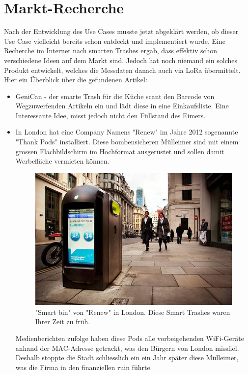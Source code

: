 \section{Markt-Recherche}
Nach der Entwicklung des Use Cases musste jetzt abgeklärt werden, ob dieser Use Case vielleicht bereits schon entdeckt und implementiert wurde. Eine Recherche im Internet nach smarten Trashes ergab, dass effektiv schon verschiedene Ideen auf dem Markt sind. Jedoch hat noch niemand ein solches Produkt entwickelt, welches die Messdaten danach auch via LoRa übermittelt. Hier ein Überblick über die gefundenen Artikel:
\begin{itemize}  
  \item GeniCan\autocite{market:genican} - der smarte Trash für die Küche scant den Barcode von Wegzuwerfenden Artikeln ein und lädt diese in eine Einkaufsliste. Eine Interessante Idee, misst jedoch nicht den Füllstand des Eimers.
  \item In London hat eine Company Namens "Renew" im Jahre 2012 sogenannte "Thank Pods"\autocite{market:LondonBins} installiert. Diese bombensicheren Mülleimer sind mit einem grossen Flachbildschirm im Hochformat ausgerüstet und sollen damit Werbefläche vermieten können. 
   \begin{figure}[H]
     \centering
        \includegraphics[scale=0.5]{pictures/London_Thank_Pod_Renew.jpg}
    \caption{"Smart bin" von "Renew" in London. Diese Smart Trashes waren Ihrer Zeit zu früh.}
    \label{fig:LondonSmartBin}
\end{figure} 
Medienberichten zufolge haben diese Pods alle vorbeigehenden WiFi-Geräte anhand der MAC-Adresse getrackt, was den Bürgern von London missfiel. Deshalb stoppte die Stadt schliesslich ein  ein Jahr später diese Mülleimer\autocite{market:LondonBinsStop}, was die Firma in den finanziellen ruin führte\autocite{market:LondonBinRuin}.

\end{itemize}
